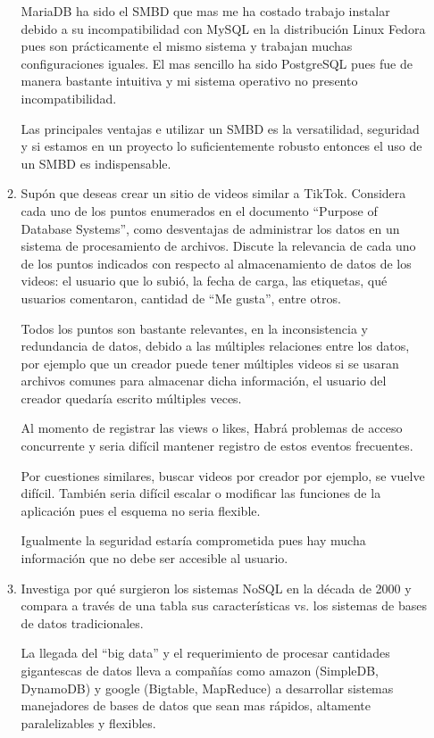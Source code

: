\documentclass[12pt,a4paper]{article}
\begin{document}
\begin{enumerate}
\begin{enumerate}
		              MariaDB ha sido el SMBD que mas me ha costado trabajo instalar debido a su incompatibilidad con MySQL en la distribución 				      Linux Fedora pues son prácticamente el mismo sistema y trabajan muchas configuraciones iguales. El mas sencillo ha sido 				      PostgreSQL pues fue de manera bastante intuitiva y mi sistema operativo no presento incompatibilidad.

			      Las principales ventajas e utilizar un SMBD es la versatilidad, seguridad y si estamos en un proyecto lo suficientemente 			      robusto entonces el uso de un SMBD es indispensable.
	
				
			\item Supón que deseas crear un sitio de videos similar a TikTok. Considera cada uno de los puntos
				enumerados en el documento “Purpose of Database Systems”, como desventajas de administrar los
				datos en un sistema de procesamiento de archivos. Discute la relevancia de cada uno de los puntos
				indicados con respecto al almacenamiento de datos de los videos: el usuario que lo subió, la fecha de
				carga, las etiquetas, qué usuarios comentaron, cantidad de “Me gusta”, entre otros.
				
			Todos los puntos son bastante relevantes, en la inconsistencia y redundancia de datos, debido a las múltiples relaciones entre los datos, por ejemplo que un creador puede tener múltiples videos si se usaran archivos comunes para almacenar dicha información, el usuario del creador quedaría escrito múltiples veces.

Al momento de registrar las views o likes, Habrá problemas de acceso concurrente y seria difícil mantener registro de estos eventos frecuentes.

Por cuestiones similares, buscar videos por creador por ejemplo, se vuelve difícil.
También seria difícil escalar o modificar las funciones de la aplicación pues el esquema no seria flexible.

Igualmente la seguridad estaría comprometida pues hay mucha información que no debe ser accesible al usuario.


			\pagebreak
			\item Investiga por qué surgieron los sistemas NoSQL en la década de 2000 y compara a través de una tabla
				sus características vs. los sistemas de bases de datos tradicionales.

				La llegada del ``big data'' y el requerimiento de procesar cantidades gigantescas de datos lleva 
				a compañías como amazon (SimpleDB, DynamoDB) y google (Bigtable, MapReduce) a desarrollar sistemas 
				manejadores de bases de datos que sean mas rápidos, altamente paralelizables y flexibles. 


\end{enumerate}
\end{enumerate}
\end{document}
